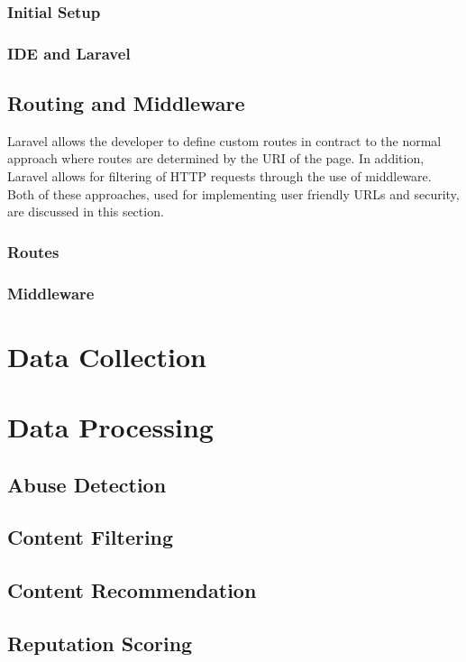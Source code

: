 \subsubsection{Initial Setup}
\subsubsection{IDE and Laravel}

\subsection{Routing and Middleware}
Laravel allows the developer to define custom routes in contract to the normal approach where routes are determined by the URI of the page. In addition, Laravel allows for filtering of HTTP requests through the use of middleware. Both of these approaches, used for implementing user friendly URLs and security, are discussed in this section.

\subsubsection{Routes}
\subsubsection{Middleware}

\section{Data Collection}

\section{Data Processing}
\subsection{Abuse Detection}
\subsection{Content Filtering}
\subsection{Content Recommendation}
\subsection{Reputation Scoring}


